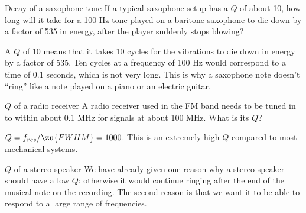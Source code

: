 \begin{eg}{Decay of a saxophone tone}
\egquestion If a typical saxophone setup has a $Q$ of about
10, how long will it take for a 100-Hz tone played on a
baritone saxophone to die down by a factor of 535 in energy,
after the player suddenly stops blowing?

\eganswer A $Q$ of 10 means that it takes 10 cycles for the
vibrations to die down in energy by a factor of 535. Ten
cycles at a frequency of 100 Hz would correspond to a time
of 0.1 seconds, which is not very long. This is why a
saxophone note doesn't ``ring'' like a note played on a
piano or an electric guitar.
\end{eg}

\begin{eg}{$Q$ of a radio receiver}
\egquestion A radio receiver used in the FM band needs to be
tuned in to within about 0.1 MHz for signals at about 100
MHz. What is its $Q$?

\eganswer $Q=f_{res}/\zu{FWHM}=1000$. This is an extremely
high $Q$ compared to most mechanical systems.
\end{eg}

\begin{eg}{$Q$ of a stereo speaker}
We have already given one reason why a stereo speaker should
have a low $Q$: otherwise it would continue ringing after
the end of the musical note on the recording. The second
reason is that we want it to be able to respond to a large
range of frequencies.
\end{eg}

